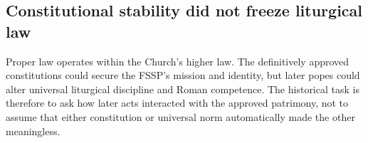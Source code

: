 \subsection{Constitutional stability did not freeze liturgical law}

Proper law operates within the Church's higher law. The definitively approved constitutions could secure the FSSP's mission and identity, but later popes could alter universal liturgical discipline and Roman competence. The historical task is therefore to ask how later acts interacted with the approved patrimony, not to assume that either constitution or universal norm automatically made the other meaningless.


